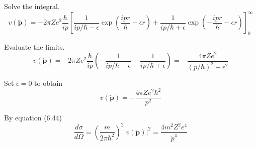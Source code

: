 Solve the integral.
\begin{equation*}
v(\breve{\mathbf p})=-2\pi Ze^2
\frac{\hbar}{ip}
\left[
\frac{1}{ip/\hbar-\epsilon}\exp\left(\frac{ipr}{\hbar}-\epsilon r\right)
+\frac{1}{ip/\hbar+\epsilon}\exp\left(-\frac{ipr}{\hbar}-\epsilon r\right)
\right]_0^\infty
\end{equation*}

Evaluate the limits.
\begin{equation*}
v(\breve{\mathbf p})=-2\pi Ze^2
\frac{\hbar}{ip}
\left(-\frac{1}{ip/\hbar-\epsilon}-\frac{1}{ip/\hbar+\epsilon}\right)
=-\frac{4\pi Ze^2}{(p/\hbar)^2+\epsilon^2}
\end{equation*}

Set $\epsilon=0$ to obtain
\begin{equation*}
v(\breve{\mathbf p})=-\frac{4\pi Ze^2\hbar^2}{p^2}
\end{equation*}

By equation (6.44)
\begin{equation*}
\frac{d\sigma}{d\Omega}=\left(\frac{m}{2\pi\hbar^2}\right)^2
|v(\breve{\mathbf p})|^2
=\frac{4m^2Z^2e^4}{\breve p^4}
\end{equation*}


